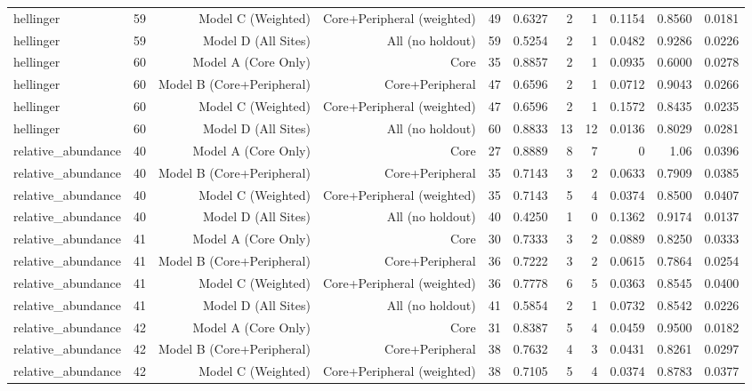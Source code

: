 {\begin{longtable}{lrrrrrrrrrr}
  hellinger & 59 & Model C (Weighted) & Core+Peripheral (weighted) & 49 & 0.6327 & 2 & 1 & 0.1154 & 0.8560 & 0.0181 \\
  hellinger & 59 & Model D (All Sites) & All (no holdout) & 59 & 0.5254 & 2 & 1 & 0.0482 & 0.9286 & 0.0226 \\
  hellinger & 60 & Model A (Core Only) & Core & 35 & 0.8857 & 2 & 1 & 0.0935 & 0.6000 & 0.0278 \\
  hellinger & 60 & Model B (Core+Peripheral) & Core+Peripheral & 47 & 0.6596 & 2 & 1 & 0.0712 & 0.9043 & 0.0266 \\
  hellinger & 60 & Model C (Weighted) & Core+Peripheral (weighted) & 47 & 0.6596 & 2 & 1 & 0.1572 & 0.8435 & 0.0235 \\
  hellinger & 60 & Model D (All Sites) & All (no holdout) & 60 & 0.8833 & 13 & 12 & 0.0136 & 0.8029 & 0.0281 \\
  relative\_abundance & 40 & Model A (Core Only) & Core & 27 & 0.8889 & 8 & 7 & 0 & 1.06 & 0.0396 \\
  relative\_abundance & 40 & Model B (Core+Peripheral) & Core+Peripheral & 35 & 0.7143 & 3 & 2 & 0.0633 & 0.7909 & 0.0385 \\
  relative\_abundance & 40 & Model C (Weighted) & Core+Peripheral (weighted) & 35 & 0.7143 & 5 & 4 & 0.0374 & 0.8500 & 0.0407 \\
  relative\_abundance & 40 & Model D (All Sites) & All (no holdout) & 40 & 0.4250 & 1 & 0 & 0.1362 & 0.9174 & 0.0137 \\
  relative\_abundance & 41 & Model A (Core Only) & Core & 30 & 0.7333 & 3 & 2 & 0.0889 & 0.8250 & 0.0333 \\
  relative\_abundance & 41 & Model B (Core+Peripheral) & Core+Peripheral & 36 & 0.7222 & 3 & 2 & 0.0615 & 0.7864 & 0.0254 \\
  relative\_abundance & 41 & Model C (Weighted) & Core+Peripheral (weighted) & 36 & 0.7778 & 6 & 5 & 0.0363 & 0.8545 & 0.0400 \\
  relative\_abundance & 41 & Model D (All Sites) & All (no holdout) & 41 & 0.5854 & 2 & 1 & 0.0732 & 0.8542 & 0.0226 \\
  relative\_abundance & 42 & Model A (Core Only) & Core & 31 & 0.8387 & 5 & 4 & 0.0459 & 0.9500 & 0.0182 \\
  relative\_abundance & 42 & Model B (Core+Peripheral) & Core+Peripheral & 38 & 0.7632 & 4 & 3 & 0.0431 & 0.8261 & 0.0297 \\
  relative\_abundance & 42 & Model C (Weighted) & Core+Peripheral (weighted) & 38 & 0.7105 & 5 & 4 & 0.0374 & 0.8783 & 0.0377 \\

\end{longtable}}
